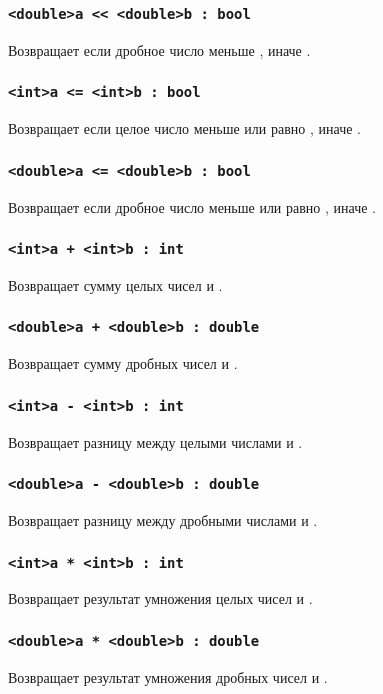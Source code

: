 \documentclass[a4paper, 14pt]{extarticle}
\begin{document}
\subsubsection{\lstinline`<double>a << <double>b : bool`}
Возвращает \true{} если дробное число  меньше , иначе \false{}.

\subsubsection{\lstinline`<int>a <= <int>b : bool`}
Возвращает \true{} если целое число  меньше или равно , иначе \false{}.

\subsubsection{\lstinline`<double>a <= <double>b : bool`}
Возвращает \true{} если дробное число  меньше или равно , иначе \false{}.


\subsubsection{\lstinline`<int>a + <int>b : int`}
Возвращает сумму целых чисел  и .

\subsubsection{\lstinline`<double>a + <double>b : double`}
Возвращает сумму дробных чисел  и .

\subsubsection{\lstinline`<int>a - <int>b : int`}
Возвращает разницу между целыми числами  и .

\subsubsection{\lstinline`<double>a - <double>b : double`}
Возвращает разницу между дробными числами  и .

\subsubsection{\lstinline`<int>a * <int>b : int`}
Возвращает результат умножения целых чисел  и .

\subsubsection{\lstinline`<double>a * <double>b : double`}
Возвращает результат умножения дробных чисел  и .
\end{document}
